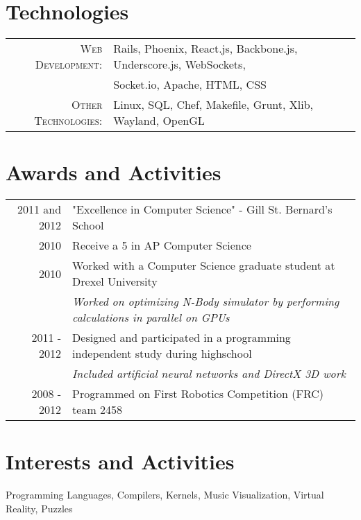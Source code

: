 \documentclass[a4paper,10pt]{article}
\begin{document}
\section{Technologies}
\begin{tabular}{rl}
  \textsc{Web Development:}    & Rails, Phoenix, React.js, Backbone.js, Underscore.js, WebSockets,\\
                               & Socket.io, Apache, HTML, CSS\\
  \textsc{Other Technologies:} & Linux, SQL, Chef, Makefile, Grunt, Xlib, Wayland, OpenGL\\
\end{tabular}

\section{Awards and Activities}
\begin{tabular}{rl}	
  2011 and 2012 & "Excellence in Computer Science" - Gill St. Bernard's School\\
  2010          & Receive a 5 in AP Computer Science\\
  2010          & Worked with a Computer Science graduate student at Drexel University\\
                & \emph{Worked on optimizing N-Body simulator by performing calculations in parallel on GPUs}\\
  2011 - 2012   & Designed and participated in a programming independent study during highschool\\
                & \emph{Included artificial neural networks and DirectX 3D work}\\
  2008 - 2012   & Programmed on First Robotics Competition (FRC) team 2458\\
\end{tabular}

\section{Interests and Activities}
Programming Languages, Compilers, Kernels, Music Visualization, Virtual Reality, Puzzles\\


\end{document}
